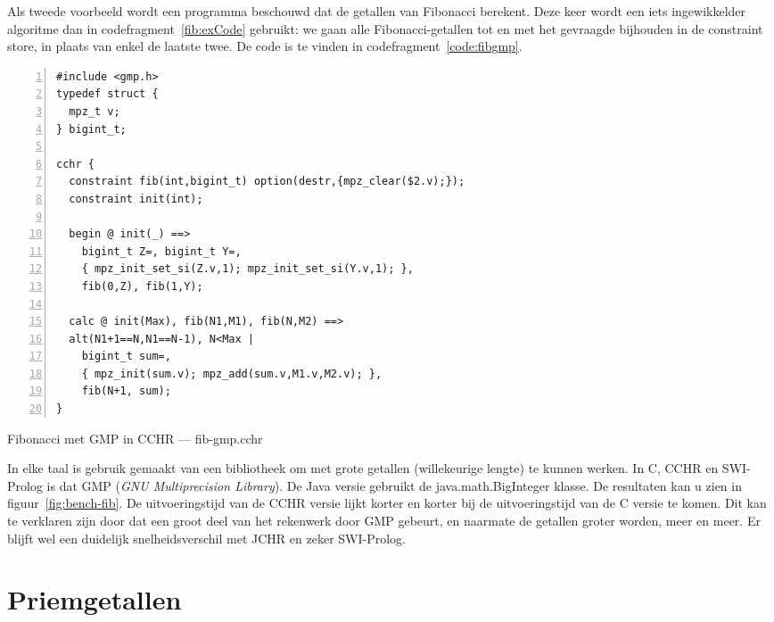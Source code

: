 Als tweede voorbeeld wordt een programma beschouwd dat de getallen van Fibonacci berekent. Deze keer wordt een iets ingewikkelder algoritme dan in codefragment~\ref{fib:exCode} gebruikt: we gaan alle Fibonacci-getallen tot en met het gevraagde bijhouden in de constraint store, in plaats van enkel de laatste twee. De code is te vinden in codefragment~\ref{code:fibgmp}.
\begin{exCode}
\begin{Verbatim}[frame=single,numbers=left]
#include <gmp.h>
typedef struct {
  mpz_t v;
} bigint_t;

cchr {
  constraint fib(int,bigint_t) option(destr,{mpz_clear($2.v);});
  constraint init(int);
  
  begin @ init(_) ==> 
    bigint_t Z=, bigint_t Y=, 
    { mpz_init_set_si(Z.v,1); mpz_init_set_si(Y.v,1); },
    fib(0,Z), fib(1,Y);

  calc @ init(Max), fib(N1,M1), fib(N,M2) ==>
  alt(N1+1==N,N1==N-1), N<Max |
    bigint_t sum=,
    { mpz_init(sum.v); mpz_add(sum.v,M1.v,M2.v); },
    fib(N+1, sum);
}
\end{Verbatim}
\caption{\label{code:fibgmp} Fibonacci met GMP in CCHR --- fib-gmp.cchr}
\end{exCode}
In elke taal is gebruik gemaakt van een bibliotheek om met grote getallen (willekeurige lengte) te kunnen werken. In C, CCHR en SWI-Prolog is dat GMP ({\em GNU Multiprecision Library}). De Java versie gebruikt de java.math.BigInteger klasse. De resultaten kan u zien in figuur~\ref{fig:bench-fib}. De uitvoeringstijd van de CCHR versie lijkt korter en korter bij de uitvoeringstijd van de C versie te komen. Dit kan te verklaren zijn door dat een groot deel van het rekenwerk door GMP gebeurt, en naarmate de getallen groter worden, meer en meer. Er blijft wel een duidelijk snelheidsverschil met JCHR en zeker SWI-Prolog.

\section{Priemgetallen} \label{sec:bench-primes}

